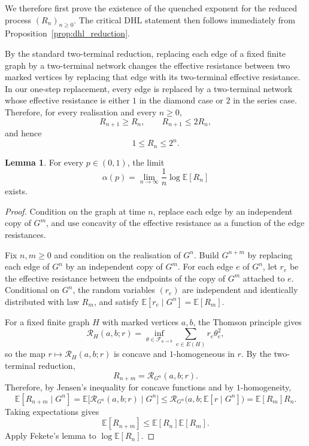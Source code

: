 \documentclass{article}
\theoremstyle{plain}
\theoremstyle{definition}
\newtheorem{lemma}[theorem]{Lemma}
\newcommand{\Reff}{\mathscr{R}}
\begin{document}
We therefore first prove the existence of the quenched exponent for the reduced process $(R_n)_{n\ge 0}$.
The critical DHL statement then follows immediately from Proposition~\ref{prop:dhl_reduction}.

By the standard two-terminal reduction, replacing each edge of a fixed finite graph by a two-terminal network changes the effective resistance between two marked vertices by replacing that edge with its two-terminal effective resistance.
In our one-step replacement, every edge is replaced by a two-terminal network whose effective resistance is either $1$ in the diamond case or $2$ in the series case.
Therefore, for every realisation and every $n\ge 0$,
\[
R_{n+1}\ge R_n,
\qquad
R_{n+1}\le 2R_n,
\]
and hence
\[
1\le R_n\le 2^n.
\]






\begin{lemma}\label{lem:annealed_exponent}
For every $p\in(0,1)$, the limit
\[
\alpha(p)=\lim_{n\to\infty}\frac{1}{n}\log \mathbb E[R_n]
\]
exists.
\end{lemma}

\begin{proof}
 
Condition on the graph at time $n$, replace each edge by an independent copy of $G^m$, and use concavity of the effective resistance as a function of the edge resistances.

Fix $n,m\ge 0$ and condition on the realisation of $G^n$.
Build $G^{n+m}$ by replacing each edge of $G^n$ by an independent copy of $G^m$.
For each edge $e$ of $G^n$, let $r_e$ be the effective resistance between the endpoints of the copy of $G^m$ attached to $e$.
Conditional on $G^n$, the random variables $(r_e)$ are independent and identically distributed with law $R_m$, and satisfy $\mathbb E[r_e\mid G^n]=\mathbb E[R_m]$.

For a fixed finite graph $H$ with marked vertices $a,b$, the Thomson principle gives
\[
\Reff_H(a,b;r)=\inf_{\theta\in\mathcal F_{a\to b}}\sum_{e\in E(H)} r_e\theta_e^2,
\]
so the map $r\mapsto \Reff_H(a,b;r)$ is concave and $1$-homogeneous in $r$.
By the two-terminal reduction,
\[
R_{n+m}=\Reff_{G^n}(a,b;r).
\]
Therefore, by Jensen's inequality for concave functions and by $1$-homogeneity,
\[
\mathbb E[R_{n+m}\mid G^n]
=
\mathbb E\bigl[\Reff_{G^n}(a,b;r)\mid G^n\bigr]
\le
\Reff_{G^n}\bigl(a,b;\mathbb E[r\mid G^n]\bigr)
=
\mathbb E[R_m]R_n.
\]
Taking expectations gives
\[
\mathbb E[R_{n+m}]\le \mathbb E[R_n]\mathbb E[R_m].
\]
Apply Fekete's lemma to $\log \mathbb E[R_n]$.
\end{proof}
\end{document}
